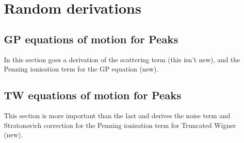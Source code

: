 \chapter{Random derivations}
\label{DerivationsAppendix}
\graphicspath{{Figures/DerivationsAppendix/}{Figures/Common/}}

\section{GP equations of motion for Peaks}
\label{DerivationsAppendix:PeaksGPEquationsOfMotion}

In this section goes a derivation of the scattering term (this isn't new), and the Penning ionisation term for the GP equation (new).

\section{TW equations of motion for Peaks}
\label{DerivationsAppendix:PeaksTWEquationsOfMotion}
This section is more important than the last and derives the noise term and Stratonovich correction for the Penning ionisation term for Truncated Wigner (new).
